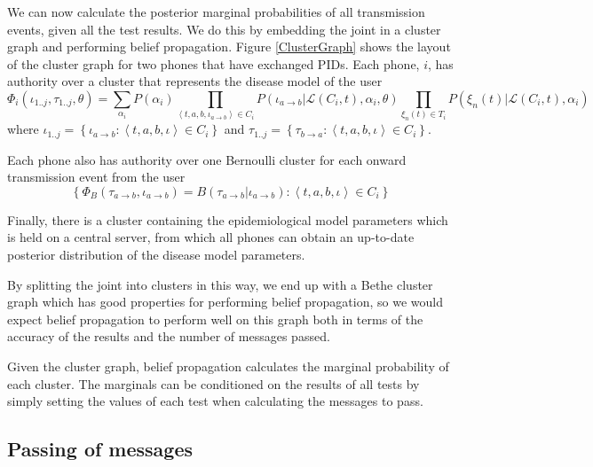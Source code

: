 \documentclass{article}
\begin{document}
We can now calculate the posterior marginal probabilities of all transmission events, given all the test results. We do this by embedding the joint in a cluster graph and performing belief propagation\cite{koller2009probabilistic}. Figure \ref{ClusterGraph} shows the layout of the cluster graph for two phones that have exchanged PIDs. Each phone, $i$, has authority over a cluster that represents the disease model of the user
\begin{equation}
\Phi_i(\iota_{1..j},\tau_{1..j}, \theta) =
\sum_{\alpha_i}P(\alpha_i)
\prod_{\left< t,a,b, \iota_{a\rightarrow b} \right> \in C_i}
P\left(\iota_{a\rightarrow b}|\mathcal{L}(C_i,t),\alpha_i, \theta \right)
\prod_{\xi_{n}(t) \in T_i}
P(\xi_{n}(t)|\mathcal{L}(C_i,t),\alpha_i)
\label{ijoint}
\end{equation}
where $\iota_{1..j} = \left\{\iota_{a\rightarrow b}:\left< t,a,b, \iota \right> \in C_i\right\}$ and $\tau_{1..j} = \left\{\tau_{b\rightarrow a}:\left< t,a,b, \iota \right> \in C_i\right\}$.

Each phone also has authority over one Bernoulli cluster for each onward transmission event from the user
\begin{equation}
\left\{ \Phi_{B}(\tau_{a\rightarrow b},\iota_{a\rightarrow b}) = B(\tau_{a\rightarrow b}|\iota_{a\rightarrow b}) : \left<t,a,b,\iota\right> \in C_i \right\}
\end{equation}
 
Finally, there is a cluster containing the epidemiological model parameters which is held on a central server, from which all phones can obtain an up-to-date posterior distribution of the disease model parameters.

By splitting the joint into clusters in this way, we end up with a Bethe cluster graph which has good properties for performing belief propagation\cite{koller2009probabilistic}, so we would expect belief propagation to perform well on this graph both in terms of the accuracy of the results and the number of messages passed.

Given the cluster graph, belief propagation calculates the marginal probability of each cluster. The marginals can be conditioned on the results of all tests by simply setting the values of each test when calculating the messages to pass.

\subsection{Passing of messages}
\end{document}
